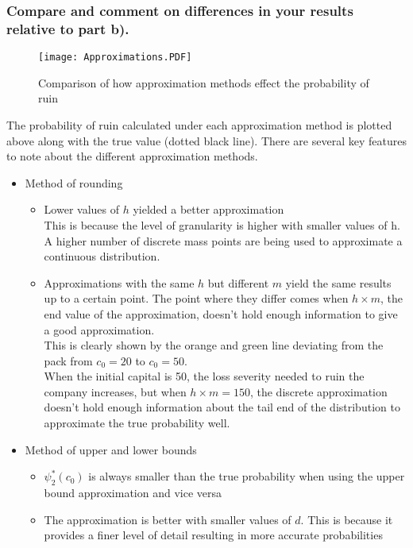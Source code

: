 \documentclass[titlepage]{article}
\begin{document}
	\subsubsection{Compare and comment on differences in your results relative to part b).}
	\begin{figure}[H]
		\centering
		\texttt{[image: Approximations.PDF]}
		\caption{Comparison of how approximation methods effect the probability of ruin} \label{fig:T2: Approximation comparison}
	\end{figure} 
	The probability of ruin calculated under each approximation method is plotted above along with the true value (dotted black line). There are several key features to note about the different approximation methods.
	\begin{itemize}
		\item Method of rounding
		\begin{itemize}
			\item Lower values of $h$ yielded a better approximation\\
			This is because the level of granularity is higher with smaller values of h. A higher number of discrete mass points are being used to approximate a continuous distribution.
			\item Approximations with the same $h$ but different $m$ yield the same results up to a certain point. The point where they differ comes when $h\times m$, the end value of the approximation, doesn't hold enough information to give a good approximation. \\
			This is clearly shown by the orange and green line deviating from the pack from $c_0 = 20$ to $c_0 = 50$.\\
			When the initial capital is 50, the loss severity needed to ruin the company increases, but when $h\times m = 150$, the discrete approximation doesn't hold enough information about the tail end of the distribution to approximate the true probability well.
		\end{itemize}
		
		\item Method of upper and lower bounds
		\begin{itemize}
			\item $\psi_2^*(c_0)$ is always smaller than the true probability when using the upper bound approximation and vice versa
			\item The approximation is better with smaller values of $d$. This is because it provides a finer level of detail resulting in more accurate probabilities
		\end{itemize}
	\end{itemize}
	
\end{document}

